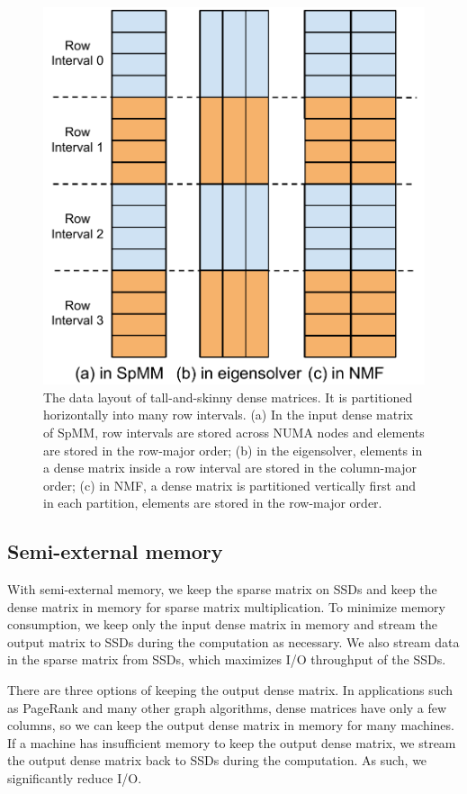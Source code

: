 \begin{figure}
\centering
\includegraphics[scale=0.4]{./dense_matrix.pdf}
\caption{The data layout of tall-and-skinny dense matrices. It is partitioned
	horizontally into many row intervals.
(a) In the input dense matrix of SpMM, row intervals are stored across NUMA nodes and
elements are stored in the row-major order; (b) in the eigensolver, elements
in a dense matrix inside a row interval are stored in the column-major order;
(c) in NMF, a dense matrix is partitioned vertically first and in each partition,
elements are stored in the row-major order.}
\label{dense_mat}
\end{figure}

\subsection{Semi-external memory}
With semi-external memory, we keep the sparse matrix on SSDs and keep the dense
matrix in memory for sparse matrix multiplication. To minimize memory
consumption, we keep only the input dense matrix in memory and
stream the output matrix to SSDs during the computation as necessary. We also stream
data in the sparse matrix from SSDs, which maximizes I/O throughput of the SSDs.

There are three options of keeping the output dense matrix. In applications
such as PageRank and many other graph
algorithms, dense matrices have only a few columns, so we can keep the output
dense matrix in memory for many machines. If a machine has insufficient
memory to keep the output dense matrix, we stream the output dense matrix
back to SSDs during the computation. As such, we significantly reduce I/O.

